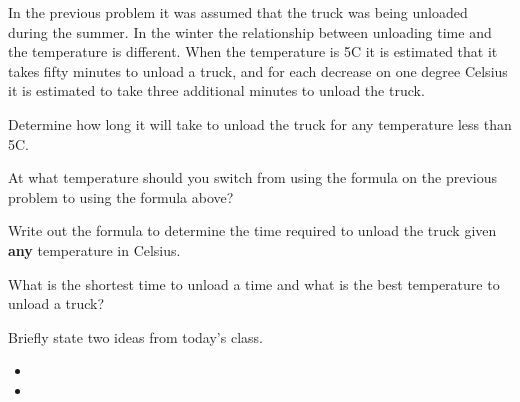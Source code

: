 \begin{problem}
  \clearpage

\item In the previous problem it was assumed that the truck was being
  unloaded during the summer. In the winter the relationship between
  unloading time and the temperature is different. When the
  temperature is 5C it is estimated that it takes fifty minutes to
  unload a truck, and for each decrease on one degree Celsius it is
  estimated to take three additional minutes to unload the truck.
  \begin{subproblem}
    \item Determine how long it will take to unload the truck for any
      temperature less than 5C.
      \vfill
    \item At what temperature should you switch from using the
      formula on the previous problem to using the formula above?
      \vfill
      \vfill
    \item Write out the formula to determine the time required to
      unload the truck given \textbf{any} temperature in Celsius.
      \vspace{3em}
    \item What is the shortest time to unload a time and what is the
      best temperature to unload a truck?  
      \vspace{2em}
  \end{subproblem}

\end{problem}

\postClass

\begin{problem}
\item Briefly state two ideas from today's class.
  \begin{itemize}
  \item 
  \item 
  \end{itemize}
\item 
  \begin{subproblem}
    \item
  \end{subproblem}
\end{problem}


